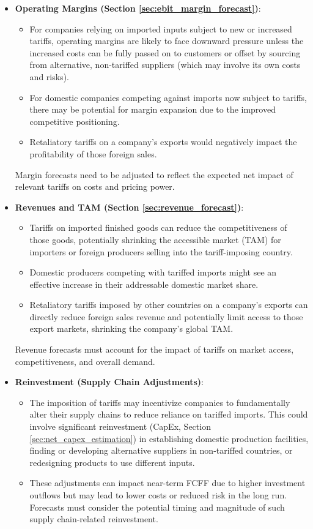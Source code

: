 \begin{itemize}
    \item \textbf{Operating Margins (Section \ref{sec:ebit_margin_forecast})}:
          \begin{itemize}
              \item For companies relying on imported inputs subject to new or increased tariffs, operating margins are likely to face downward pressure unless the increased costs can be fully passed on to customers or offset by sourcing from alternative, non-tariffed suppliers (which may involve its own costs and risks).
              \item For domestic companies competing against imports now subject to tariffs, there may be potential for margin expansion due to the improved competitive positioning.
              \item Retaliatory tariffs on a company's exports would negatively impact the profitability of those foreign sales.
          \end{itemize}
          Margin forecasts need to be adjusted to reflect the expected net impact of relevant tariffs on costs and pricing power.

    \item \textbf{Revenues and TAM (Section \ref{sec:revenue_forecast})}:
          \begin{itemize}
              \item Tariffs on imported finished goods can reduce the competitiveness of those goods, potentially shrinking the accessible market (TAM) for importers or foreign producers selling into the tariff-imposing country.
              \item Domestic producers competing with tariffed imports might see an effective increase in their addressable domestic market share.
              \item Retaliatory tariffs imposed by other countries on a company's exports can directly reduce foreign sales revenue and potentially limit access to those export markets, shrinking the company's global TAM.
          \end{itemize}
          Revenue forecasts must account for the impact of tariffs on market access, competitiveness, and overall demand.

    \item \textbf{Reinvestment (Supply Chain Adjustments)}:
          \begin{itemize}
              \item The imposition of tariffs may incentivize companies to fundamentally alter their supply chains to reduce reliance on tariffed imports. This could involve significant reinvestment (CapEx, Section \ref{sec:net_capex_estimation}) in establishing domestic production facilities, finding or developing alternative suppliers in non-tariffed countries, or redesigning products to use different inputs.
              \item These adjustments can impact near-term FCFF due to higher investment outflows but may lead to lower costs or reduced risk in the long run. Forecasts must consider the potential timing and magnitude of such supply chain-related reinvestment.
          \end{itemize}


\end{itemize}
